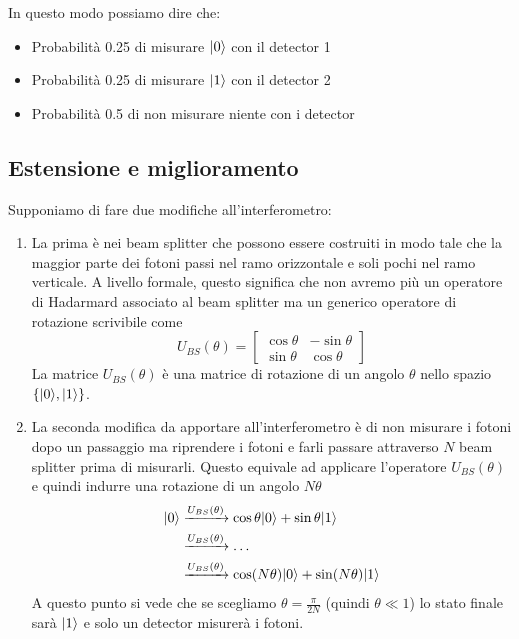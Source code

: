 \documentclass[12pt, a4paper]{report}
\begin{document}
In questo modo possiamo dire che:
\begin{itemize}
    \item Probabilità 0.25 di misurare $| 0 \rangle$ con il detector 1
    \item Probabilità 0.25 di misurare $| 1 \rangle$ con il detector 2
    \item Probabilità 0.5 di non misurare niente con i detector 
\end{itemize}
\subsection{Estensione e miglioramento}
Supponiamo di fare due modifiche all'interferometro:
\begin{enumerate}
    \item La prima è nei beam splitter che possono essere costruiti in modo tale che la maggior parte dei fotoni passi nel ramo orizzontale e soli pochi nel ramo verticale. A livello formale, questo significa che non avremo più un operatore di Hadarmard associato al beam splitter ma un generico operatore di rotazione scrivibile come \begin{equation*}
        U_{BS}(\theta) = \begin{bmatrix}
            \cos\theta & -\sin\theta \\
            \sin\theta & \cos\theta
        \end{bmatrix}
    \end{equation*} La matrice $U_{BS}(\theta)$ è una matrice di rotazione di un angolo $\theta$ nello spazio $\{| 0 \rangle,| 1 \rangle\}$.
    \item La seconda modifica da apportare all'interferometro è di non misurare i fotoni dopo un passaggio ma riprendere i fotoni e farli passare attraverso $N$ beam splitter prima di misurarli. Questo equivale ad applicare l'operatore $U_{BS}(\theta)$ e quindi indurre una rotazione di un angolo $N\theta$ \begin{equation*}
        \begin{split}
            | 0 \rangle &\xrightarrow{U_{BS}(\theta)} \cos\theta| 0 \rangle+\sin\theta| 1 \rangle \\
            &\xrightarrow{U_{BS}(\theta)} \ldots \\
            &\xrightarrow{U_{BS}(\theta)} \cos(N\theta)| 0 \rangle+\sin(N\theta)| 1 \rangle
        \end{split}
    \end{equation*}
    A  questo punto si vede che se scegliamo $\theta = \frac{\pi}{2N}$ (quindi $\theta\ll 1$) lo stato finale sarà $| 1 \rangle$ e solo un detector misurerà i fotoni.
\end{enumerate}
\end{document}

